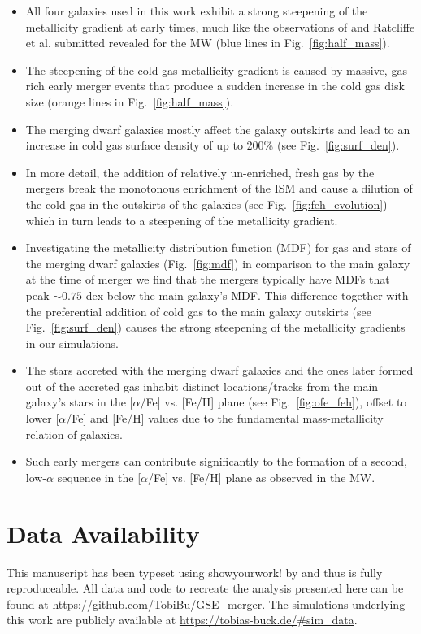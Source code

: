 \documentclass[useAMS,usenatbib]{mnras}
\begin{document}
\begin{itemize}
%
\item All four galaxies used in this work exhibit a strong steepening of the metallicity gradient at early times, much like the observations of \citet{Lu2022b} and Ratcliffe et al. submitted revealed for the MW (blue lines in Fig.~\ref{fig:half_mass}).  
%
\item The steepening of the cold gas metallicity gradient is caused by massive, gas rich early merger events that produce a sudden increase in the cold gas disk size (orange lines in Fig.~\ref{fig:half_mass}).
%
\item The merging dwarf galaxies mostly affect the galaxy outskirts and lead to an increase in cold gas surface density of up to 200\% (see Fig.~\ref{fig:surf_den}).
%
\item In more detail, the addition of relatively un-enriched, fresh gas by the mergers break the monotonous enrichment of the ISM and cause a dilution of the cold gas in the outskirts of the galaxies (see Fig.~\ref{fig:feh_evolution}) which in turn leads to a steepening of the metallicity gradient.
%
\item Investigating the metallicity distribution function (MDF) for gas and stars of the merging dwarf galaxies (Fig.~\ref{fig:mdf}) in comparison to the main galaxy at the time of merger we find that the mergers typically have MDFs that peak $\sim0.75$ dex below the main galaxy's MDF. This difference together with the preferential addition of cold gas to the main galaxy outskirts (see Fig.~\ref{fig:surf_den}) causes the strong steepening of the metallicity gradients in our simulations.
%
\item The stars accreted with the merging dwarf galaxies and the ones later formed out of the accreted gas inhabit distinct locations/tracks from the main galaxy's stars in the [$\alpha$/Fe] vs. [Fe/H] plane (see Fig.~\ref{fig:ofe_feh}), offset to lower [$\alpha$/Fe] and [Fe/H] values due to the fundamental mass-metallicity relation of galaxies. 
%
\item Such early mergers can contribute significantly to the formation of a second, low-$\alpha$ sequence in the [$\alpha$/Fe] vs. [Fe/H] plane as observed in the MW.  
\end{itemize}

\section*{Data Availability}
This manuscript has been typeset using showyourwork! by \citet{Luger2021} and thus is fully reproduceable. All data and code to recreate the analysis presented here can be found at \url{https://github.com/TobiBu/GSE_merger}. The simulations underlying this work are publicly available at \url{https://tobias-buck.de/#sim_data}.
\end{document}
